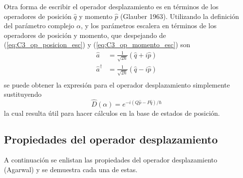 Otra forma de escribir el operador desplazamiento es en términos de los operadores de posición $\hat{q}$ y momento $\hat{p}$ (Glauber 1963). Utilizando la definición del parámetro complejo $\alpha$, y los parámetros escalera en términos de los operadores de posición y momento, que despejando de (\ref{eq:C3_op_posicion_esc}) y (\ref{eq:C3_op_momento_esc}) son
\begin{align}
  \hat{a}           & = \frac{1}{\sqrt{2\hbar}}(\hat{q} + i\hat{p}) \\
  \hat{a}^{\dagger} & = \frac{1}{\sqrt{2\hbar}}(\hat{q} - i\hat{p}) \\
\end{align}
se puede obtener la expresión para el operador desplazamiento simplemente sustituyendo
\begin{equation}
  \hat{D}(\alpha) = e^{-i(Q\hat{p}-P\hat{q})/\hbar}
\end{equation}
la cual resulta útil para hacer cálculos en la base de estados de posición.

\subsection{Propiedades del operador desplazamiento}

A continuación se enlistan las propiedades del operador desplazamiento (Agarwal) y se demuestra cada una de estas.

